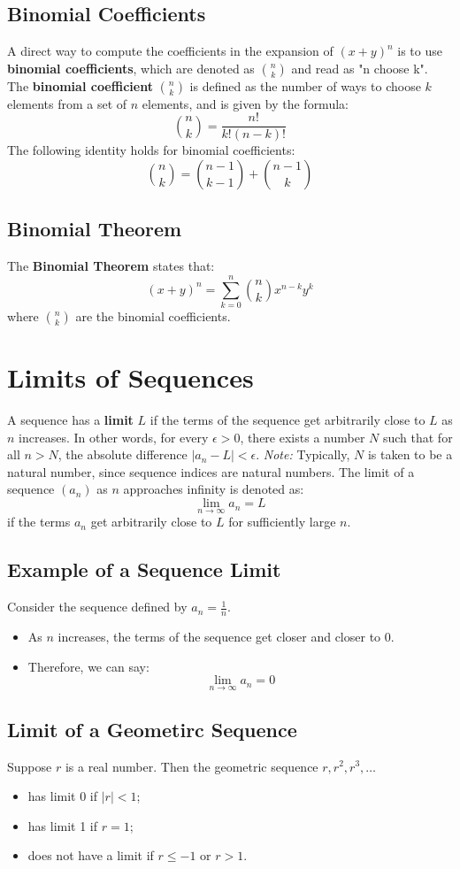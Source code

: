 \subsection{Binomial Coefficients}
A direct way to compute the coefficients in the expansion of \((x + y)^n\) is to use \textbf{binomial coefficients}, which are denoted as \(\binom{n}{k}\) and read as "n choose k".
The \textbf{binomial coefficient} \(\binom{n}{k}\) is defined as the number of ways to choose \(k\) elements from a set of \(n\) elements, and is given by the formula:
\[ \binom{n}{k} = \frac{n!}{k!(n-k)!} \]
The following identity holds for binomial coefficients:
\[ \binom{n}{k} = \binom{n-1}{k-1} + \binom{n-1}{k} \]

\subsection{Binomial Theorem}
The \textbf{Binomial Theorem} states that:
\[ (x + y)^n = \sum_{k=0}^{n} \binom{n}{k} x^{n-k} y^k \]
where \(\binom{n}{k}\) are the binomial coefficients.

\section{Limits of Sequences}
A sequence has a \textbf{limit} \(L\) if the terms of the sequence get arbitrarily close to \(L\) as \(n\) increases. In other words, for every \(\epsilon > 0\), there exists a number \(N\) such that for all \(n > N\), the absolute difference \(|a_n - L| < \epsilon\).
\textit{Note:} Typically, \(N\) is taken to be a natural number, since sequence indices are natural numbers.
The limit of a sequence \((a_n)\) as \(n\) approaches infinity is denoted as:
\[ \lim_{n \to \infty} a_n = L \]
if the terms \(a_n\) get arbitrarily close to \(L\) for sufficiently large \(n\).

\subsection{Example of a Sequence Limit}
Consider the sequence defined by \(a_n = \frac{1}{n}\).
\begin{itemize}
    \item As \(n\) increases, the terms of the sequence get closer and closer to 0.
    \item Therefore, we can say:
    \[ \lim_{n \to \infty} a_n = 0 \]
\end{itemize}

\subsection{Limit of a Geometirc Sequence}
Suppose \(r\) is a real number. Then the geometric sequence \(r, r^2, r^3, \ldots\)
\begin{itemize}
    \item has limit 0 if \(|r| < 1\);
    \item has limit 1 if \(r = 1\);
    \item does not have a limit if \(r \leq -1\) or \(r > 1\).
\end{itemize}

